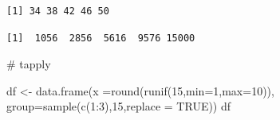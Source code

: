 \documentclass[
  letterpaper,
  DIV=11,
  numbers=noendperiod]{scrreprt}
\newenvironment{Shaded}{\begin{snugshade}}{\end{snugshade}}
\newcommand{\AttributeTok}[1]{\textcolor[rgb]{0.40,0.45,0.13}{#1}}
\newcommand{\CommentTok}[1]{\textcolor[rgb]{0.37,0.37,0.37}{#1}}
\newcommand{\ConstantTok}[1]{\textcolor[rgb]{0.56,0.35,0.01}{#1}}
\newcommand{\DecValTok}[1]{\textcolor[rgb]{0.68,0.00,0.00}{#1}}
\newcommand{\FunctionTok}[1]{\textcolor[rgb]{0.28,0.35,0.67}{#1}}
\newcommand{\NormalTok}[1]{\textcolor[rgb]{0.00,0.23,0.31}{#1}}
\newcommand{\OtherTok}[1]{\textcolor[rgb]{0.00,0.23,0.31}{#1}}
\newcommand{\SpecialCharTok}[1]{\textcolor[rgb]{0.37,0.37,0.37}{#1}}
\begin{document}
\begin{Shaded}
\end{Shaded}

\begin{verbatim}
[1] 34 38 42 46 50
\end{verbatim}

\begin{Shaded}
\end{Shaded}

\begin{verbatim}
[1]  1056  2856  5616  9576 15000
\end{verbatim}

\begin{Shaded}
\begin{Highlighting}[]
\CommentTok{\# tapply}

\NormalTok{df }\OtherTok{\textless{}{-}} \FunctionTok{data.frame}\NormalTok{(}\AttributeTok{x =}\FunctionTok{round}\NormalTok{(}\FunctionTok{runif}\NormalTok{(}\DecValTok{15}\NormalTok{,}\AttributeTok{min=}\DecValTok{1}\NormalTok{,}\AttributeTok{max=}\DecValTok{10}\NormalTok{)),}
                 \AttributeTok{group=}\FunctionTok{sample}\NormalTok{(}\FunctionTok{c}\NormalTok{(}\DecValTok{1}\SpecialCharTok{:}\DecValTok{3}\NormalTok{),}\DecValTok{15}\NormalTok{,}\AttributeTok{replace =} \ConstantTok{TRUE}\NormalTok{))}
\NormalTok{df}
\end{Highlighting}
\end{Shaded}
\end{document}

